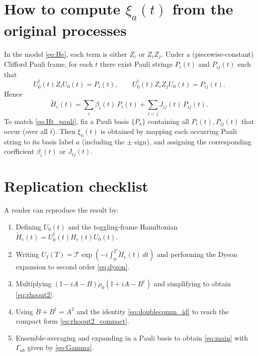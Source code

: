 \documentclass[11pt]{article}
\newcommand{\id}{\mathbb{I}}
\begin{document}
\section{How to compute $\xi_a(t)$ from the original processes}
In the model \eqref{eq:He}, each term is either $Z_i$ or $Z_iZ_j$. Under a (piecewise-constant) Clifford Pauli frame, for each $t$ there exist Pauli strings $P_i(t)$ and $P_{ij}(t)$ such that
\begin{equation}
U_0^\dagger(t) Z_i U_0(t)=P_i(t),\qquad
U_0^\dagger(t) Z_iZ_j U_0(t)=P_{ij}(t).
\end{equation}
Hence
\begin{equation}
\widetilde H_e(t)=\sum_i \beta_i(t)\,P_i(t)+\sum_{i<j}J_{ij}(t)\,P_{ij}(t).
\end{equation}
To match \eqref{eq:Ht_pauli}, fix a Pauli basis $\{P_a\}$ containing all $P_i(t),P_{ij}(t)$ that occur (over all $t$). Then $\xi_a(t)$ is obtained by mapping each occurring Pauli string to its basis label $a$ (including the $\pm$ sign), and assigning the corresponding coefficient $\beta_i(t)$ or $J_{ij}(t)$.

\section{Replication checklist}
A reader can reproduce the result by:
\begin{enumerate}
\item Defining $U_0(t)$ and the toggling-frame Hamiltonian $\widetilde H_e(t)=U_0^\dagger(t)H_e(t)U_0(t)$.
\item Writing $U_I(T)=\mathcal{T}\exp(-i\int_0^T \widetilde H_e(t)\,dt)$ and performing the Dyson expansion to second order \eqref{eq:dyson}.
\item Multiplying $(\id-iA-B)\rho_0(\id+iA-B^\dagger)$ and simplifying to obtain \eqref{eq:rhoout2}.
\item Using $B+B^\dagger=A^2$ and the identity \eqref{eq:doublecomm_id} to reach the compact form \eqref{eq:rhoout2_compact}.
\item Ensemble-averaging and expanding in a Pauli basis to obtain \eqref{eq:main} with $\Gamma_{ab}$ given by \eqref{eq:Gamma}.
\end{enumerate}
\end{document}
